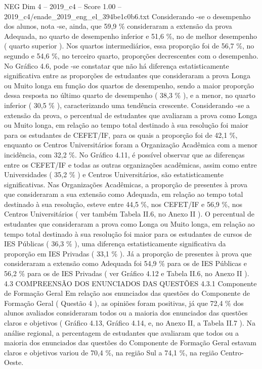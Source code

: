 \begin{textsample}{NEG Dim 4 – 2019\_c4 – Score 1.00 – 2019\_c4/enade\_2019\_eng\_el\_394be1c0b6.txt}
Considerando -se o desempenho dos alunos, nota -se, ainda, que 59,9 \% consideraram a extensão da prova Adequada, no quarto de desempenho inferior e 51,6 \%, no de melhor desempenho ( quarto superior ).
Nos quartos intermediários, essa proporção foi de 56,7 \%, no segundo e 54,6 \%, no terceiro quarto, proporções decrescentes com o desempenho.
No Gráfico 4.6, pode -se constatar que não há diferença estatisticamente significativa entre as proporções de estudantes que consideraram a prova Longa ou Muito longa em função dos quartos de desempenho, sendo a maior proporção dessa resposta no último quarto de desempenho ( 38,3 \% ), e a menor, no quarto inferior ( 30,5 \% ), caracterizando uma tendência crescente.
Considerando -se a extensão da prova, o percentual de estudantes que avaliaram a prova como Longa ou Muito longa, em relação ao tempo total destinado à sua resolução foi maior para os estudantes de CEFET/IF, para os quais a proporção foi de 42,1 \%, enquanto os Centros Universitários foram a Organização Acadêmica com a menor incidência, com 32,2 \%.
No Gráfico 4.11, é possível observar que as diferenças entre os CEFET/IF e todas as outras organizações acadêmicas, assim como entre Universidades ( 35,2 \% ) e Centros Universitários, são estatisticamente significativas.
Nas Organizações Acadêmicas, a proporção de presentes à prova que consideraram a sua extensão como Adequada, em relação ao tempo total destinado à sua resolução, esteve entre 44,5 \%, nos CEFET/IF e 56,9 \%, nos Centros Universitários ( ver também Tabela II.6, no Anexo II ).
O percentual de estudantes que consideraram a prova como Longa ou Muito longa, em relação ao tempo total destinado à sua resolução foi maior para os estudantes de cursos de IES Públicas ( 36,3 \% ), uma diferença estatisticamente significativa da proporção em IES Privadas ( 33,1 \% ).
Já a proporção de presentes à prova que consideraram a extensão como Adequada foi 54,9 \% para os de IES Públicas e 56,2 \% para os de IES Privadas ( ver Gráfico 4.12 e Tabela II.6, no Anexo II ). 4.3 COMPREENSÃO DOS ENUNCIADOS DAS QUESTÕES 4.3.1 Componente de Formação Geral Em relação aos enunciados das questões do Componente de Formação Geral ( Questão 4 ), as opiniões foram positivas, já que 72,4 \% dos alunos avaliados consideraram todos ou a maioria dos enunciados das questões claros e objetivos ( Gráfico 4.13, Gráfico 4.14, e, no Anexo II, a Tabela II.7 ).
Na análise regional, a percentagem de estudantes que avaliaram que todos ou a maioria dos enunciados das questões do Componente de Formação Geral estavam claros e objetivos variou de 70,4 \%, na região Sul a 74,1 \%, na região Centro-Oeste.

\end{textsample}
